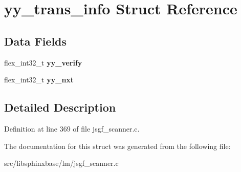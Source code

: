 \section{yy\-\_\-trans\-\_\-info \-Struct \-Reference}
\label{structyy__trans__info}
\subsection*{\-Data \-Fields}
\begin{DoxyCompactItemize}
\item 
flex\-\_\-int32\-\_\-t {\bfseries yy\-\_\-verify}\label{structyy__trans__info_a5c9f61e770deef50bd4e697310342fe9}

\item 
flex\-\_\-int32\-\_\-t {\bfseries yy\-\_\-nxt}\label{structyy__trans__info_ae0715250c2bef261e596e77e0030f13e}

\end{DoxyCompactItemize}


\subsection{\-Detailed \-Description}


\-Definition at line 369 of file jsgf\-\_\-scanner.\-c.



\-The documentation for this struct was generated from the following file\-:\begin{DoxyCompactItemize}
\item 
src/libsphinxbase/lm/jsgf\-\_\-scanner.\-c\end{DoxyCompactItemize}

